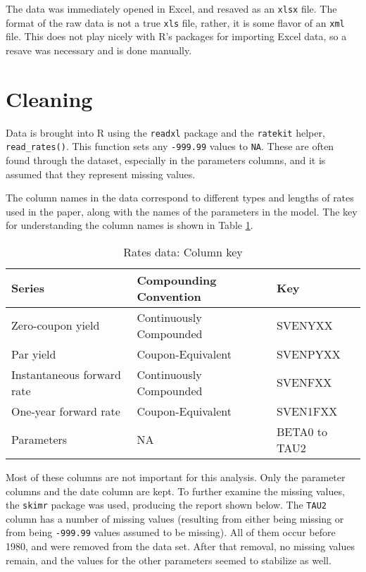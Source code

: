 \documentclass[openany]{book}
\theoremstyle{definition}
\theoremstyle{definition}
\theoremstyle{definition}
\theoremstyle{remark}
\begin{document}
The data was immediately opened in Excel, and resaved as an
\texttt{xlsx} file. The format of the raw data is not a true
\texttt{xls} file, rather, it is some flavor of an \texttt{xml} file.
This does not play nicely with R's packages for importing Excel data, so
a resave was necessary and is done manually.

\hypertarget{cleaning}{%
\section{Cleaning}\label{cleaning}}

Data is brought into R using the \texttt{readxl} package and the
\texttt{ratekit} helper, \texttt{read\_rates()}. This function sets any
\texttt{-999.99} values to \texttt{NA}. These are often found through
the dataset, especially in the parameters columns, and it is assumed
that they represent missing values.

\small

\normalsize

The column names in the data correspond to different types and lengths
of rates used in the paper, along with the names of the parameters in
the model. The key for understanding the column names is shown in Table
\ref{tab:meta}.

\small

\begin{table}[H]

\caption{\label{tab:meta}Rates data: Column key}
\centering
\begin{tabular}[t]{lll}
\toprule
Series & Compounding Convention & Key\\
\midrule
Zero-coupon yield & Continuously Compounded & SVENYXX\\
Par yield & Coupon-Equivalent & SVENPYXX\\
Instantaneous forward rate & Continuously Compounded & SVENFXX\\
One-year forward rate & Coupon-Equivalent & SVEN1FXX\\
Parameters & NA & BETA0 to TAU2\\
\bottomrule
\end{tabular}
\end{table}

\normalsize

Most of these columns are not important for this analysis. Only the
parameter columns and the date column are kept. To further examine the
missing values, the \texttt{skimr} package was used, producing the
report shown below. The \texttt{TAU2} column has a number of missing
values (resulting from either being missing or from being
\texttt{-999.99} values assumed to be missing). All of them occur before
1980, and were removed from the data set. After that removal, no missing
values remain, and the values for the other parameters seemed to
stabilize as well.
\end{document}

